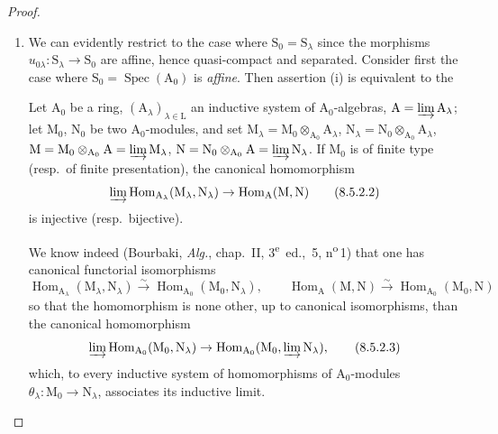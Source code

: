 \begin{proof}
\begin{enumerate}[label=(\roman*)]
  \item We can evidently restrict to the case where $\mathrm{S}_0=\mathrm{S}_\lambda$ since the morphisms $u_{0\lambda}:\mathrm{S}_\lambda\to\mathrm{S}_0$ are affine, hence quasi-compact and separated.
Consider first the case where $\mathrm{S}_0=\operatorname{Spec}(\mathrm{A}_0)$ is \emph{affine}.
Then assertion (i) is equivalent to the

\begin{lemma}[8.5.2.1]
\label{IV.8.5.2.1}
Let $\mathrm{A}_0$ be a ring, $(\mathrm{A}_\lambda)_{\lambda\in\mathrm{L}}$ an inductive system of $\mathrm{A}_0$-algebras, $\mathrm{A}=\varinjlim\mathrm{A}_\lambda$; let $\mathrm{M}_0$, $\mathrm{N}_0$ be two $\mathrm{A}_0$-modules, and set $\mathrm{M}_\lambda=\mathrm{M}_0\otimes_{\mathrm{A}_0}\mathrm{A}_\lambda$, $\mathrm{N}_\lambda=\mathrm{N}_0\otimes_{\mathrm{A}_0}\mathrm{A}_\lambda$, $\mathrm{M}=\mathrm{M}_0\otimes_{\mathrm{A}_0}\mathrm{A}=\varinjlim\mathrm{M}_\lambda$, $\mathrm{N}=\mathrm{N}_0\otimes_{\mathrm{A}_0}\mathrm{A}=\varinjlim\mathrm{N}_\lambda$.
If $\mathrm{M}_0$ is of finite type (resp.\ of finite presentation), the canonical homomorphism
\begin{equation}
  \varinjlim\operatorname{Hom}_{\mathrm{A}_\lambda}(\mathrm{M}_\lambda,\mathrm{N}_\lambda)\to\operatorname{Hom}_\mathrm{A}(\mathrm{M},\mathrm{N})
  \tag{8.5.2.2}
\label{IV.8.5.2.2}
\end{equation}
is injective (resp.\ bijective).
\end{lemma}

We know indeed (Bourbaki, \emph{Alg.}, chap.~II, 3\textsuperscript{e}~ed., \textsection\,5, n\textsuperscript{o}\,1) that one has canonical functorial isomorphisms
\[
  \operatorname{Hom}_{\mathrm{A}_\lambda}(\mathrm{M}_\lambda,\mathrm{N}_\lambda)\xrightarrow{\sim}\operatorname{Hom}_{\mathrm{A}_0}(\mathrm{M}_0,\mathrm{N}_\lambda),\qquad\operatorname{Hom}_\mathrm{A}(\mathrm{M},\mathrm{N})\xrightarrow{\sim}\operatorname{Hom}_{\mathrm{A}_0}(\mathrm{M}_0,\mathrm{N})
\]
so that the homomorphism  is none other, up to canonical isomorphisms, than the canonical homomorphism
\begin{equation}
  \varinjlim\operatorname{Hom}_{\mathrm{A}_0}(\mathrm{M}_0,\mathrm{N}_\lambda)\to\operatorname{Hom}_{\mathrm{A}_0}(\mathrm{M}_0,\varinjlim\mathrm{N}_\lambda),
  \tag{8.5.2.3}
\label{IV.8.5.2.3}
\end{equation}
which, to every inductive system of homomorphisms of $\mathrm{A}_0$-modules $\theta_\lambda:\mathrm{M}_0\to\mathrm{N}_\lambda$, associates its inductive limit.


\end{enumerate}
\end{proof}
